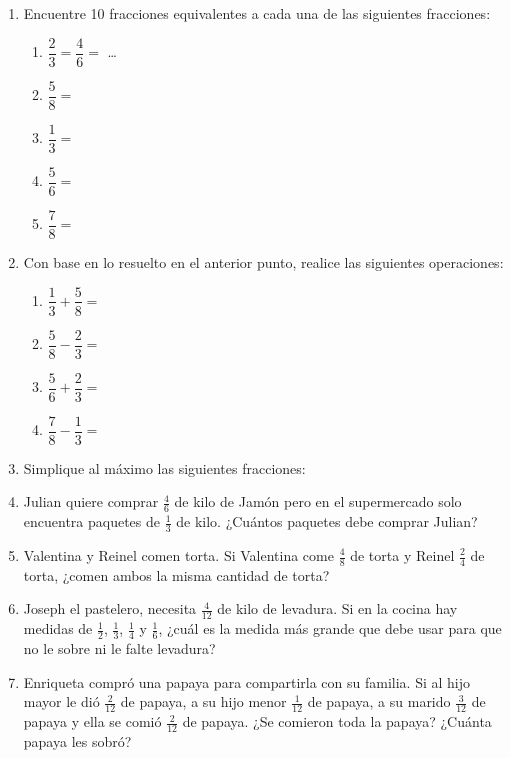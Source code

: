 \documentclass[fleqn]{article}
\begin{document}
\begin{enumerate}
 \item Encuentre 10 fracciones equivalentes a cada una de las siguientes fracciones:
 \begin{enumerate}
 \item $\dfrac{2}{3}=\dfrac{4}{6}=$ \dots
 \item $\dfrac{5}{8}=$
 \item $\dfrac{1}{3}=$
 \item $\dfrac{5}{6}=$
 \item $\dfrac{7}{8}=$
 \end{enumerate}
 \item Con base en lo resuelto en el anterior punto, realice las siguientes operaciones:
 \begin{enumerate}
 \item $\dfrac{1}{3}+\dfrac{5}{8}=$
 \item $\dfrac{5}{8}-\dfrac{2}{3}=$
 \item $\dfrac{5}{6}+\dfrac{2}{3}=$
 \item $\dfrac{7}{8}-\dfrac{1}{3}=$
 \end{enumerate}
 \item Simplique al máximo las siguientes fracciones:
\begin{enumerate}
\end{enumerate}
\item Julian quiere comprar $\frac{4}{6}$ de kilo de Jamón pero en el supermercado solo encuentra  paquetes de $\frac{1}{3}$ de kilo. ¿Cuántos paquetes debe comprar Julian?\noanswer
\item Valentina y Reinel comen torta. Si Valentina come $\frac{4}{8}$ de torta y Reinel $\frac{2}{4}$ de torta, ¿comen ambos la misma cantidad de torta?\noanswer
\item Joseph el pastelero, necesita $\frac{4}{12}$ de kilo de levadura. Si en la cocina hay medidas de $\frac{1}{2}$, $\frac{1}{3}$, $\frac{1}{4}$ y $\frac{1}{6}$, ¿cu\'{a}l es la medida m\'{a}s grande que debe usar para que no le sobre ni le falte levadura?\noanswer
 \item Enriqueta compró una papaya para compartirla con su familia. Si al hijo mayor le dió $\frac{2}{12} $ de papaya, a su hijo menor $\frac{1}{12}$ de papaya, a su marido $\frac{3}{12}$ de papaya y ella se comió $\frac{2}{12}$ de papaya. ¿Se comieron toda la papaya? ¿Cuánta papaya les sobró?\noanswer
 \end{enumerate}
\end{document}
